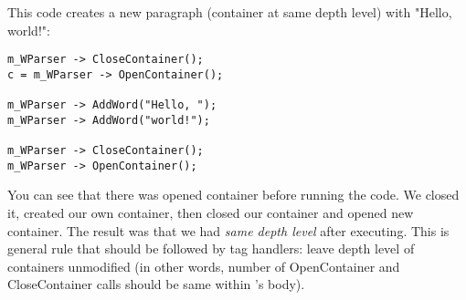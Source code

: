 
This code creates a new paragraph (container at same depth level)
with "Hello, world!":

\begin{verbatim}
m_WParser -> CloseContainer();
c = m_WParser -> OpenContainer();

m_WParser -> AddWord("Hello, ");
m_WParser -> AddWord("world!");

m_WParser -> CloseContainer();
m_WParser -> OpenContainer();
\end{verbatim}

\begin{comment}
and here is image of the situation:

\helponly{\image{}{hello.bmp}}
\end{comment}

You can see that there was opened container before running the code. We closed
it, created our own container, then closed our container and opened
new container. The result was that we had {\it same depth level} after
executing. This is general rule that should be followed by tag handlers:
leave depth level of containers unmodified (in other words, number of
OpenContainer and CloseContainer calls should be same within 's body).

